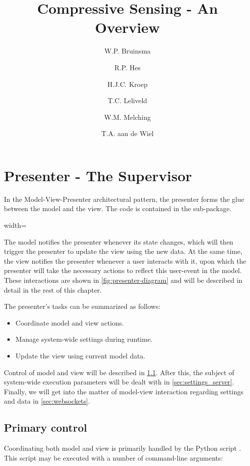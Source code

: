 \documentclass[a4paper, openany, oneside]{memoir}
\title{Compressive Sensing - An Overview}
\author{W.P. Bruinsma \and R.P. Hes \and H.J.C. Kroep \and T.C. Leliveld \and W.M. Melching \and T.A. aan de Wiel}
\begin{document}
\chapter{Presenter - The Supervisor}
\label{cha:presenter}
In the Model-View-Presenter architectural pattern, the presenter forms the glue between the model and the view. The code is contained in the  sub-package.
\begin{figure*}[h]
    \centering
    \begin{adjustbox}{width=\textwidth}
    
    \end{adjustbox}
    \caption{The presenter and the central role it fulfils in the system}
    \label{fig:presenter-diagram}
\end{figure*}

The model notifies the presenter whenever its state changes, which will then trigger the presenter to update the view using the new data. At the same time, the view notifies the presenter whenever a user interacts with it, upon which the presenter will take the necessary actions to reflect this user-event in the model. These interactions are shown in \cref{fig:presenter-diagram} and will be described in detail in the rest of this chapter.

The presenter's tasks can be summarized as follows:
\begin{itemize}
	\item Coordinate model and view actions.
	\item Manage system-wide settings during runtime.
	\item Update the view using current model data.
\end{itemize}

Control of model and view will be described in \cref{sec:control}. After this, the subject of system-wide execution parameters will be dealt with in \cref{sec:settings_server}. Finally, we will get into the matter of model-view interaction regarding settings and data in \cref{sec:websockets}.

\section{Primary control}
\label{sec:control}
Coordinating both model and view is primarily handled by the Python script . This script may be executed with a number of command-line arguments:
\end{document}
